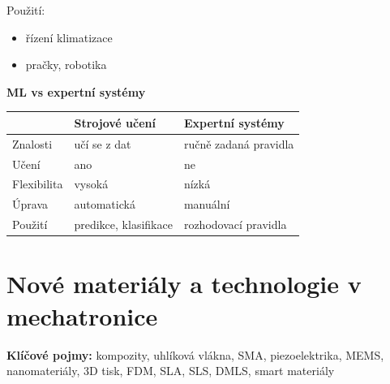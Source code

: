 \documentclass[a4paper,10pt]{article}
\begin{document}
\begin{vysvetlenibox}
Použití:
\begin{itemize}
\item řízení klimatizace
\item pračky, robotika
\end{itemize}

\textbf{ML vs expertní systémy}

\begin{tabularx}{\linewidth}{l X X}
\toprule
 & Strojové učení & Expertní systémy \\
\midrule
Znalosti & učí se z dat & ručně zadaná pravidla \\
Učení & ano & ne \\
Flexibilita & vysoká & nízká \\
Úprava & automatická & manuální \\
Použití & predikce, klasifikace & rozhodovací pravidla \\
\bottomrule
\end{tabularx}

\end{vysvetlenibox}



\newpage


\section{Nové materiály a technologie v mechatronice}

\begin{pojmybox}
\textbf{Klíčové pojmy:}
kompozity, uhlíková vlákna, SMA, piezoelektrika,
MEMS, nanomateriály, 3D tisk,
FDM, SLA, SLS, DMLS, smart materiály
\end{pojmybox}
\end{document}
